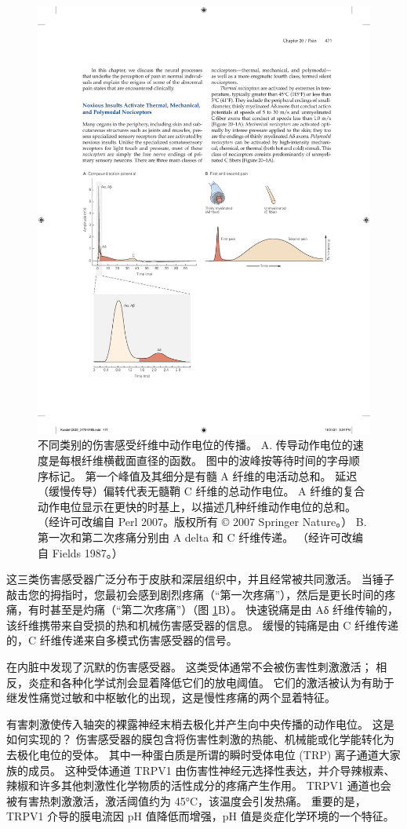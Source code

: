 \begin{figure}[htbp]
	\centering
	\includegraphics[width=0.7\linewidth]{chap20/fig_20_1}
	\caption{不同类别的伤害感受纤维中动作电位的传播。 
		A. 传导动作电位的速度是每根纤维横截面直径的函数。 
		图中的波峰按等待时间的字母顺序标记。 
		第一个峰值及其细分是有髓 A 纤维的电活动总和。 
		延迟（缓慢传导）偏转代表无髓鞘 C 纤维的总动作电位。 
		A 纤维的复合动作电位显示在更快的时基上，以描述几种纤维动作电位的总和。 （经许可改编自 Perl 2007。版权所有 © 2007 Springer Nature。） 
		B. 第一次和第二次疼痛分别由 A delta 和 C 纤维传递。 （经许可改编自 Fields 1987。）}
	\label{fig:20_1}
\end{figure}


这三类伤害感受器广泛分布于皮肤和深层组织中，并且经常被共同激活。
当锤子敲击您的拇指时，您最初会感到剧烈疼痛（“第一次疼痛”），然后是更长时间的疼痛，有时甚至是灼痛（“第二次疼痛”）（图 \ref{fig:20_1}B）。
快速锐痛是由 Aδ 纤维传输的，该纤维携带来自受损的热和机械伤害感受器的信息。
缓慢的钝痛是由 C 纤维传递的，C 纤维传递来自多模式伤害感受器的信号。


在内脏中发现了沉默的伤害感受器。 
这类受体通常不会被伤害性刺激激活； 
相反，炎症和各种化学试剂会显着降低它们的放电阈值。
它们的激活被认为有助于继发性痛觉过敏和中枢敏化的出现，这是慢性疼痛的两个显着特征。


有害刺激使传入轴突的裸露神经末梢去极化并产生向中央传播的动作电位。 
这是如何实现的？ 
伤害感受器的膜包含将伤害性刺激的热能、机械能或化学能转化为去极化电位的受体。 
其中一种蛋白质是所谓的瞬时受体电位 (TRP) 离子通道大家族的成员。 
这种受体通道 TRPV1 由伤害性神经元选择性表达，并介导辣椒素、辣椒和许多其他刺激性化学物质的活性成分的疼痛产生作用。 
TRPV1 通道也会被有害热刺激激活，激活阈值约为 45°C，该温度会引发热痛。 
重要的是，TRPV1 介导的膜电流因 pH 值降低而增强，pH 值是炎症化学环境的一个特征。


